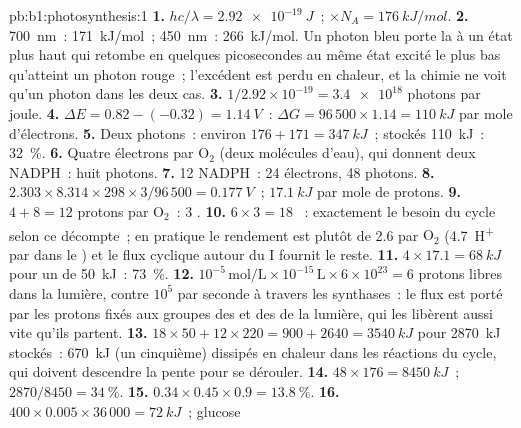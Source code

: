 \begin{solution}{pb:b1:photosynthesis:1}
\textbf{1.} $hc/\lambda = \qty{2.92e-19}{J}$~; $\times N_A = \qty{176}{kJ/mol}$.
\textbf{2.} \qty{700}{nm}~: \qty{171}{kJ/mol}~; \qty{450}{nm}~:
\qty{266}{kJ/mol}. Un photon bleu porte la  à un état plus
haut qui retombe en quelques picosecondes au même état excité le plus
bas qu'atteint un photon rouge~; l'excédent est perdu en chaleur, et la
chimie ne voit qu'un photon dans les deux cas.
\textbf{3.} $1/2.92\times 10^{-19} = \num{3.4e18}$ photons par joule.
\textbf{4.} $\Delta E = 0.82 - (-0.32) = \qty{1.14}{V}$~: $\Delta G =
96\,500\times 1.14 = \qty{110}{kJ}$ par mole d'électrons.
\textbf{5.} Deux photons~: environ $176 + 171 = \qty{347}{kJ}$~; stockés
\qty{110}{kJ}~: \qty{32}{\%}.
\textbf{6.} Quatre électrons par $\mathrm{O_2}$ (deux molécules d'eau),
qui donnent deux NADPH~: huit photons.
\textbf{7.} 12 NADPH~: 24 électrons, 48 photons.
\textbf{8.} $2.303\times 8.314\times 298\times 3/96\,500 = \qty{0.177}{V}$~;
$\qty{17.1}{kJ}$ par mole de protons.
\textbf{9.} $4 + 8 = 12$ protons par $\mathrm{O_2}$~: 3 .
\textbf{10.} $6\times 3 = 18$ ~: exactement le besoin du cycle selon
ce décompte~; en pratique le rendement est plutôt de 2.6 par
$\mathrm{O_2}$ (\qty{4.7}{H^+} par  dans le ) et le flux
cyclique autour du  I fournit le reste.
\textbf{11.} $4\times 17.1 = \qty{68}{kJ}$ pour un  de \qty{50}{kJ}~:
\qty{73}{\%}.
\textbf{12.} $10^{-5}\,\mathrm{mol/L}\times 10^{-15}\,\mathrm{L}\times
6\times 10^{23} = 6$ protons libres dans la lumière, contre $10^5$ par
seconde à travers les synthases~: le flux est porté par les protons
fixés aux groupes  des  et des  de la lumière,
qui les libèrent aussi vite qu'ils partent.
\textbf{13.} $18\times 50 + 12\times 220 = 900 + 2640 = \qty{3540}{kJ}$
pour \qty{2870}{kJ} stockés~: \qty{670}{kJ} (un cinquième) dissipés en
chaleur dans les réactions du cycle, qui doivent descendre la pente pour
se dérouler.
\textbf{14.} $48\times 176 = \qty{8450}{kJ}$~; $2870/8450 = \qty{34}{\%}$.
\textbf{15.} $0.34\times 0.45\times 0.9 = \qty{13.8}{\%}$.
\textbf{16.} $400\times 0.005\times 36\,000 = \qty{72}{kJ}$~; glucose

\end{solution}
